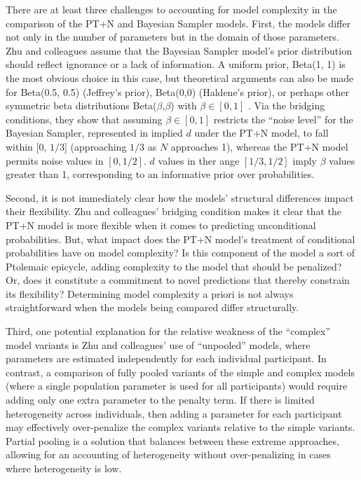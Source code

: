 \documentclass[
  man,floatsintext]{apa6}
\begin{document}
There are at least three challenges to accounting for model complexity in the comparison of the PT+N and Bayesian Sampler models. First, the models differ not only in the number of parameters but in the domain of those parameters. Zhu and colleagues \autocite*{zhu.etal2020} assume that the Bayesian Sampler model's prior distribution should reflect ignorance or a lack of information. A uniform prior, Beta(1, 1) is the most obvious choice in this case, but theoretical arguments can also be made for Beta(0.5, 0.5) (Jeffrey's prior), Beta(0,0) (Haldene's prior), or perhaps other symmetric beta distributions Beta(\(\beta\),\(\beta\)) with \(\beta \in [0, 1]\) \autocite{jaynes2003}. Via the bridging conditions, they show that assuming \(\beta \in [0, 1]\) restricts the ``noise level'' for the Bayesian Sampler, represented in implied \(d\) under the PT+N model, to fall within {[}0, \(1/3\){]} (approaching \(1/3\) as \(N\) approaches 1), whereas the PT+N model permits noise values in \([0, 1/2]\). \(d\) values in ther ange \([1/3, 1/2]\) imply \(\beta\) values greater than 1, corresponding to an informative prior over probabilities.

Second, it is not immediately clear how the models' structural differences impact their flexibility. Zhu and colleagues' \autocite*{zhu.etal2020} bridging condition makes it clear that the PT+N model is more flexible when it comes to predicting unconditional probabilities. But, what impact does the PT+N model's treatment of conditional probabilities have on model complexity? Is this component of the model a sort of Ptolemaic epicycle, adding complexity to the model that should be penalized? Or, does it constitute a commitment to novel predictions that thereby constrain its flexibility? Determining model complexity a priori is not always straightforward when the models being compared differ structurally.

Third, one potential explanation for the relative weakness of the ``complex'' model variants is Zhu and colleagues' \autocite*{zhu.etal2020} use of ``unpooled'' models, where parameters are estimated independently for each individual participant. In contrast, a comparison of fully pooled variants of the simple and complex models (where a single population parameter is used for all participants) would require adding only one extra parameter to the penalty term. If there is limited heterogeneity across individuals, then adding a parameter for each participant may effectively over-penalize the complex variants relative to the simple variants. Partial pooling is a solution that balances between these extreme approaches, allowing for an accounting of heterogeneity without over-penalizing in cases where heterogeneity is low.
\end{document}
